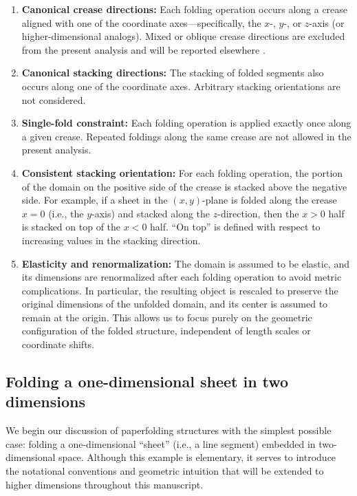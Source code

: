 \documentclass[12pt]{iopart}
\begin{document}
\begin{enumerate}
    \item \textbf{Canonical crease directions:} Each folding operation occurs along a crease aligned with one of the coordinate axes—specifically, the \( x \)-, \( y \)-, or \( z \)-axis (or higher-dimensional analogs). Mixed or oblique crease directions are excluded from the present analysis and will be reported elsewhere \cite{Fujioka2026}.

    \item \textbf{Canonical stacking directions:} The stacking of folded segments also occurs along one of the coordinate axes. Arbitrary stacking orientations are not considered.

    \item \textbf{Single-fold constraint:} Each folding operation is applied exactly once along a given crease. Repeated foldings along the same crease are not allowed in the present analysis.

    \item \textbf{Consistent stacking orientation:} For each folding operation, the portion of the domain on the positive side of the crease is stacked above the negative side. For example, if a sheet in the \( (x,y) \)-plane is folded along the crease \( x = 0 \) (i.e., the \( y \)-axis) and stacked along the \( z \)-direction, then the \( x > 0 \) half is stacked on top of the \( x < 0 \) half. “On top” is defined with respect to increasing values in the stacking direction.

    \item \textbf{Elasticity and renormalization:} The domain is assumed to be elastic, and its dimensions are renormalized after each folding operation to avoid metric complications. In particular, the resulting object is rescaled to preserve the original dimensions of the unfolded domain, and its center is assumed to remain at the origin. This allows us to focus purely on the geometric configuration of the folded structure, independent of length scales or coordinate shifts.
\end{enumerate}



\subsection{Folding a one-dimensional sheet in two dimensions}
\label{Folding a one-dimensional sheet in two dimensions}

We begin our discussion of paperfolding structures with the simplest possible case: folding a one-dimensional ``sheet'' (i.e., a line segment) embedded in two-dimensional space. Although this example is elementary, it serves to introduce the notational conventions and geometric intuition that will be extended to higher dimensions throughout this manuscript.
\end{document}
